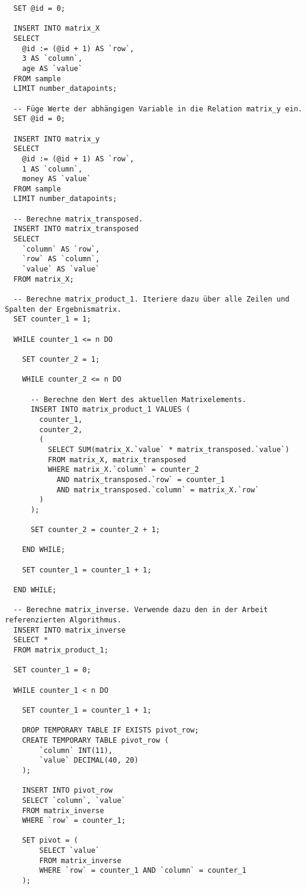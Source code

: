 \begin{verbatim}
  SET @id = 0;

  INSERT INTO matrix_X
  SELECT
    @id := (@id + 1) AS `row`,
    3 AS `column`,
    age AS `value`
  FROM sample
  LIMIT number_datapoints;

  -- Füge Werte der abhängigen Variable in die Relation matrix_y ein.
  SET @id = 0;

  INSERT INTO matrix_y
  SELECT
    @id := (@id + 1) AS `row`,
    1 AS `column`,
    money AS `value`
  FROM sample
  LIMIT number_datapoints;

  -- Berechne matrix_transposed.
  INSERT INTO matrix_transposed
  SELECT
    `column` AS `row`,
    `row` AS `column`,
    `value` AS `value`
  FROM matrix_X;

  -- Berechne matrix_product_1. Iteriere dazu über alle Zeilen und Spalten der Ergebnismatrix.
  SET counter_1 = 1;

  WHILE counter_1 <= n DO

    SET counter_2 = 1;

    WHILE counter_2 <= n DO

      -- Berechne den Wert des aktuellen Matrixelements.
      INSERT INTO matrix_product_1 VALUES (
        counter_1,
        counter_2,
        (
          SELECT SUM(matrix_X.`value` * matrix_transposed.`value`)
          FROM matrix_X, matrix_transposed
          WHERE matrix_X.`column` = counter_2
            AND matrix_transposed.`row` = counter_1
            AND matrix_transposed.`column` = matrix_X.`row`
        )
      );

      SET counter_2 = counter_2 + 1;

    END WHILE;

    SET counter_1 = counter_1 + 1;

  END WHILE;

  -- Berechne matrix_inverse. Verwende dazu den in der Arbeit referenzierten Algorithmus.
  INSERT INTO matrix_inverse
  SELECT *
  FROM matrix_product_1;

  SET counter_1 = 0;

  WHILE counter_1 < n DO

    SET counter_1 = counter_1 + 1;

    DROP TEMPORARY TABLE IF EXISTS pivot_row;
    CREATE TEMPORARY TABLE pivot_row (
        `column` INT(11),
        `value` DECIMAL(40, 20)
    );

    INSERT INTO pivot_row
    SELECT `column`, `value`
    FROM matrix_inverse
    WHERE `row` = counter_1;

    SET pivot = (
        SELECT `value`
        FROM matrix_inverse
        WHERE `row` = counter_1 AND `column` = counter_1
    );


\end{verbatim}
